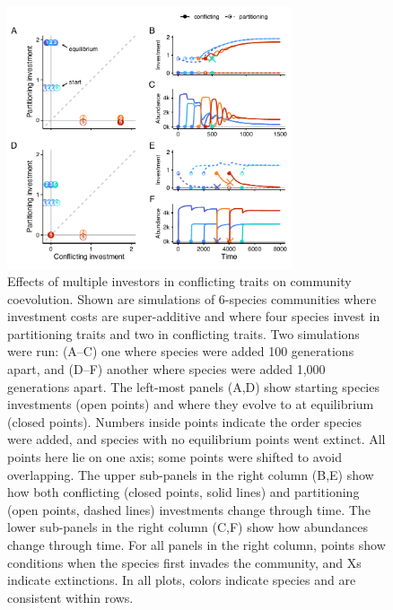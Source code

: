 \documentclass[11pt]{article}
\begin{document}
\begin{figure}[ht!]
\centering
\includegraphics[width=0.75\textwidth,keepaspectratio]{5-comm_inv_ar.pdf}
\caption{Effects of multiple investors in conflicting traits on community coevolution. Shown are simulations of 6-species communities where investment costs are super-additive and where four species invest in partitioning traits and two in conflicting traits. Two simulations were run: (A--C) one where species were added 100 generations apart, and (D--F) another where species were added 1,000 generations apart. The left-most panels (A,D) show starting species investments (open points) and where they evolve to at equilibrium (closed points). Numbers inside points indicate the order species were added, and species with no equilibrium points went extinct. All points here lie on one axis; some points were shifted to avoid overlapping. The upper sub-panels in the right column (B,E) show how both conflicting (closed points, solid lines) and partitioning (open points, dashed lines) investments change through time. The lower sub-panels in the right column (C,F) show how abundances change through time. For all panels in the right column, points show conditions when the species first invades the community, and Xs indicate extinctions. In all plots, colors indicate species and are consistent within rows.}
\label{fig:community-invasions-armsrace}
\end{figure}


\clearpage


\end{document}
